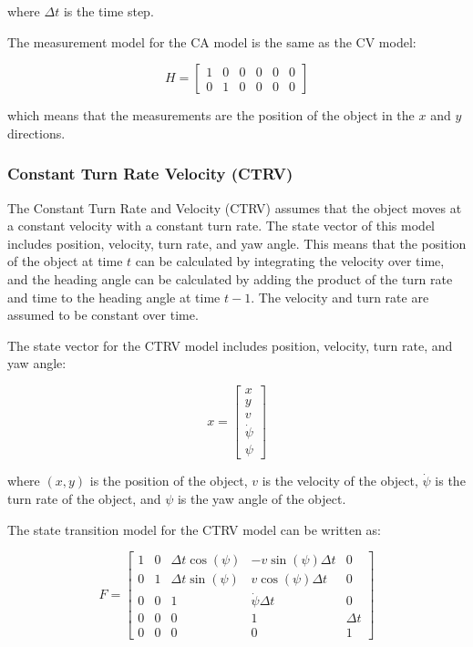where $\Delta t$ is the time step.

The measurement model for the CA model is the same as the CV model:

\begin{equation}
	H = \begin{bmatrix}
		1 & 0 & 0 & 0 & 0 & 0 \\ 
		0 & 1 & 0 & 0 & 0 & 0
	\end{bmatrix}
\end{equation}

which means that the measurements are the position of the object in the $x$ and $y$ directions.

\subsubsection{Constant Turn Rate Velocity (CTRV)}
\label{subsubsec:3_CTRV}

The Constant Turn Rate and Velocity (CTRV) assumes that the object moves at a constant velocity with a constant turn rate. The state vector of this model includes position, velocity, turn rate, and yaw angle. This means that the position of the object at time $t$ can be calculated by integrating the velocity over time, and the heading angle can be calculated by adding the product of the turn rate and time to the heading angle at time $t-1$. The velocity and turn rate are assumed to be constant over time.

The state vector for the CTRV model includes position, velocity, turn rate, and yaw angle:

\begin{equation}
	x = \begin{bmatrix}
		x \\ 
		y \\ 
		v \\ 
		\dot{\psi} \\ 
		\psi
	\end{bmatrix}
\end{equation}

where $(x,y)$ is the position of the object, $v$ is the velocity of the object, $\dot{\psi}$ is the turn rate of the object, and $\psi$ is the yaw angle of the object.

The state transition model for the CTRV model can be written as:

\begin{equation}
	F = \begin{bmatrix}
		1 & 0 & \Delta t\cos(\psi) & -v\sin(\psi)\Delta t & 0 \\ 
		0 & 1 & \Delta t\sin(\psi) & v\cos(\psi)\Delta t & 0 \\
		0 & 0 & 1 & \dot{\psi}\Delta t & 0 \\ 
		0 & 0 & 0 & 1 & \Delta t \\ 
		0 & 0 & 0 & 0 & 1
	\end{bmatrix}
\end{equation}

